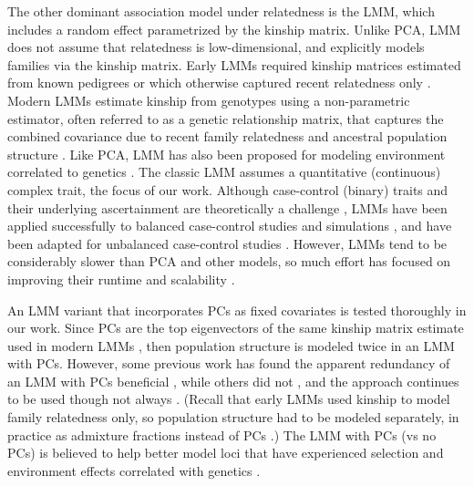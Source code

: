 \documentclass[11pt]{article}
\begin{document}
\begin{linenumbers}
The other dominant association model under relatedness is the LMM, which includes a random effect parametrized by the kinship matrix.
Unlike PCA, LMM does not assume that relatedness is low-dimensional, and explicitly models families via the kinship matrix.
Early LMMs required kinship matrices estimated from known pedigrees or which otherwise captured recent relatedness only \citep{yu_unified_2006, zhao_arabidopsis_2007}.
Modern LMMs estimate kinship from genotypes using a non-parametric estimator, often referred to as a genetic relationship matrix, that captures the combined covariance due to recent family relatedness and ancestral population structure \citep{kang_efficient_2008, astle_population_2009, ochoa_estimating_2021}.
Like PCA, LMM has also been proposed for modeling environment correlated to genetics \citep{vilhjalmsson_nature_2013, wang_trade-offs_2022}.
The classic LMM assumes a quantitative (continuous) complex trait, the focus of our work.
Although case-control (binary) traits and their underlying ascertainment are theoretically a challenge \citep{yang_advantages_2014}, LMMs have been applied successfully to balanced case-control studies \citep{astle_population_2009, kang_variance_2010} and simulations \citep{price_new_2010, wu_comparison_2011, sul_mixed_2013}, and have been adapted for unbalanced case-control studies \citep{zhou_efficiently_2018}.
However, LMMs tend to be considerably slower than PCA and other models, so much effort has focused on improving their runtime and scalability \citep{aulchenko_genomewide_2007, kang_efficient_2008, kang_variance_2010, zhang_mixed_2010, lippert_fast_2011, yang_gcta:_2011, listgarten_improved_2012, zhou_genome-wide_2012, svishcheva_rapid_2012, loh_efficient_2015, zhou_efficiently_2018}.

An LMM variant that incorporates PCs as fixed covariates is tested thoroughly in our work.
Since PCs are the top eigenvectors of the same kinship matrix estimate used in modern LMMs \citep{astle_population_2009, janss_inferences_2012, hoffman_correcting_2013, zhang_principal_2015}, then population structure is modeled twice in an LMM with PCs.
However, some previous work has found the apparent redundancy of an LMM with PCs beneficial \citep{price_new_2010, tucker_improving_2014, zhang_principal_2015}, while others did not \citep{liu_controlling_2011, janss_inferences_2012}, and the approach continues to be used \citep{zeng_signatures_2018, mbatchou_computationally_2021} though not always \citep{matoba_gwas_2020}.
(Recall that early LMMs used kinship to model family relatedness only, so population structure had to be modeled separately, in practice as admixture fractions instead of PCs \citep{yu_unified_2006, zhao_arabidopsis_2007}.)
The LMM with PCs (vs no PCs) is believed to help better model loci that have experienced selection \citep{price_new_2010, vilhjalmsson_nature_2013} and environment effects correlated with genetics \citep{zhang_principal_2015}.


\end{linenumbers}
\end{document}
